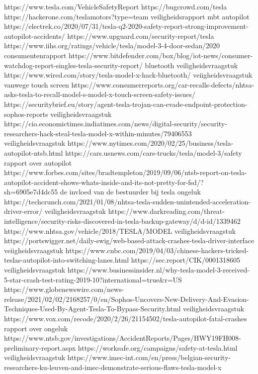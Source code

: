 https://www.tesla.com/VehicleSafetyReport
https://bugcrowd.com/tesla
https://hackerone.com/teslamotors?type=team
veiligheidsrapport mbt autopilot
https://electrek.co/2020/07/31/tesla-q2-2020-safety-report-strong-improvement-autopilot-accidents/
https://www.upguard.com/security-report/tesla
https://www.iihs.org/ratings/vehicle/tesla/model-3-4-door-sedan/2020
consumentenrapport
https://www.bitdefender.com/box/blog/iot-news/consumer-watchdog-report-singles-tesla-security-report/
bluetooth veiligheidsvraagstuk
https://www.wired.com/story/tesla-model-x-hack-bluetooth/
veiigheidsvraagstuk vanwege touch screen
https://www.consumerreports.org/car-recalls-defects/nhtsa-asks-tesla-to-recall-model-s-model-x-touch-screen-safety-issues/
https://securitybrief.eu/story/agent-tesla-trojan-can-evade-endpoint-protection-sophos-reports
veiligheidsvraagstuk
https://cio.economictimes.indiatimes.com/news/digital-security/security-researchers-hack-steal-tesla-model-x-within-minutes/79406553
veiligheidsvraagstuk
https://www.nytimes.com/2020/02/25/business/tesla-autopilot-ntsb.html
https://cars.usnews.com/cars-trucks/tesla/model-3/safety
rapport over autopilot
https://www.forbes.com/sites/bradtempleton/2019/09/06/ntsb-report-on-tesla-autopilot-accident-shows-whats-inside-and-its-not-pretty-for-fsd/?sh=6905e7d4dc55
de invloed van de bestuurder bij tesla ongeluk
https://techcrunch.com/2021/01/08/nhtsa-tesla-sudden-unintended-acceleration-driver-error/
veiligheidsvraagstuk
https://www.darkreading.com/threat-intelligence/security-risks-discovered-in-tesla-backup-gateway/d/d-id/1339462
https://www.nhtsa.gov/vehicle/2018/TESLA/MODEL%
veiligheidsvraagstuk
https://portswigger.net/daily-swig/web-based-attack-crashes-tesla-driver-interface
veiigheidsvraagstuk
https://www.cnbc.com/2019/04/03/chinese-hackers-tricked-teslas-autopilot-into-switching-lanes.html
https://sec.report/CIK/0001318605
veiligheidsvraagstuk
https://www.businessinsider.nl/why-tesla-model-3-received-5-star-crash-test-rating-2019-10?international=true&r=US
https://www.globenewswire.com/news-release/2021/02/02/2168257/0/en/Sophos-Uncovers-New-Delivery-And-Evasion-Techniques-Used-By-Agent-Tesla-To-Bypass-Security.html
veiligheidsvraagstuk
https://www.vox.com/recode/2020/2/26/21154502/tesla-autopilot-fatal-crashes
rapport over ongeluk
https://www.ntsb.gov/investigations/AccidentReports/Pages/HWY19FH008-preliminary-report.aspx
https://worksafe.org/campaigns/safety-at-tesla.html
veiligheidsvraagstuk
https://www.imec-int.com/en/press/belgian-security-researchers-ku-leuven-and-imec-demonstrate-serious-flaws-tesla-model-x
